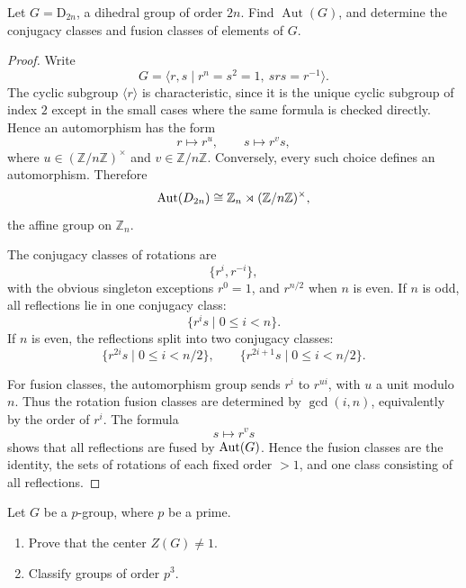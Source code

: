 \begin{exercise}
Let \(G = \mathrm{D}_{2n}\), a dihedral group of order \(2n\). Find
\(\operatorname{Aut}(G)\), and determine the conjugacy classes and fusion classes of
elements of \(G\).
\end{exercise}

\begin{proof}
Write
\[
    G=\langle r,s\mid r^n=s^2=1,\ srs=r^{-1}\rangle.
\]
The cyclic subgroup \(\langle r\rangle\) is characteristic, since it is the
unique cyclic subgroup of index \(2\) except in the small cases where the same
formula is checked directly. Hence an automorphism has the form
\[
    r\mapsto r^u,\qquad s\mapsto r^v s,
\]
where \(u\in(\mathbb Z/n\mathbb Z)^\times\) and \(v\in\mathbb Z/n\mathbb Z\).
Conversely, every such choice defines an automorphism. Therefore
\[
    \operatorname{Aut}(D_{2n})\cong \mathbb Z_n\rtimes (\mathbb Z/n\mathbb Z)^\times,
\]
the affine group on \(\mathbb Z_n\).

The conjugacy classes of rotations are
\[
    \{r^i,r^{-i}\},
\]
with the obvious singleton exceptions \(r^0=1\), and \(r^{n/2}\) when \(n\) is
even. If \(n\) is odd, all reflections lie in one conjugacy class:
\[
    \{r^i s\mid 0\leq i<n\}.
\]
If \(n\) is even, the reflections split into two conjugacy classes:
\[
    \{r^{2i}s\mid 0\leq i<n/2\},
    \qquad
    \{r^{2i+1}s\mid 0\leq i<n/2\}.
\]

For fusion classes, the automorphism group sends \(r^i\) to \(r^{ui}\), with
\(u\) a unit modulo \(n\). Thus the rotation fusion classes are determined by
\(\gcd(i,n)\), equivalently by the order of \(r^i\). The formula
\[
    s\mapsto r^v s
\]
shows that all reflections are fused by \(\operatorname{Aut}(G)\). Hence the fusion classes
are the identity, the sets of rotations of each fixed order \(>1\), and one
class consisting of all reflections.
\end{proof}

\begin{exercise}
Let \(G\) be a \(p\)-group, where \(p\) be a prime.
\begin{enumerate}[label=(\alph*)]
    \item Prove that the center \(Z(G) \neq 1\).
    \item Classify groups of order \(p^3\).
\end{enumerate}
\end{exercise}

